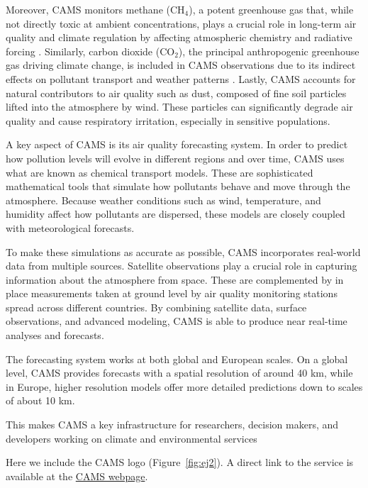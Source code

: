 Moreover, CAMS monitors methane (CH$_4$), a potent greenhouse gas that, while not directly toxic at ambient concentrations, plays a crucial role in long-term air quality and climate regulation by affecting atmospheric chemistry and radiative forcing \cite{lelieveld1993climate}. Similarly, carbon dioxide (CO$_2$), the principal anthropogenic greenhouse gas driving climate change, is included in CAMS observations due to its indirect effects on pollutant transport and weather patterns \cite{ebi2008climate}. Lastly, CAMS accounts for natural contributors to air quality such as dust, composed of fine soil particles lifted into the atmosphere by wind. These particles can significantly degrade air quality and cause respiratory irritation, especially in sensitive populations.

A key aspect of CAMS is its air quality forecasting system. In order to predict how pollution levels will evolve in different regions and over time, CAMS uses what are known as chemical transport models. These are sophisticated mathematical tools that simulate how pollutants behave and move through the atmosphere. Because weather conditions such as wind, temperature, and humidity affect how pollutants are dispersed, these models are closely coupled with meteorological forecasts.

To make these simulations as accurate as possible, CAMS incorporates real-world data from multiple sources. Satellite observations play a crucial role in capturing information about the atmosphere from space. These are complemented by in place measurements taken at ground level by air quality monitoring stations spread across different countries. By combining satellite data, surface observations, and advanced modeling, CAMS is able to produce near real-time analyses and forecasts.

The forecasting system works at both global and European scales. On a global level, CAMS provides forecasts with a spatial resolution of around 40 km, while in Europe, higher resolution models offer more detailed predictions down to scales of about 10 km.

This makes CAMS a key infrastructure for researchers, decision makers, and developers working on
climate and environmental services


Here we include the CAMS logo (Figure~\ref{fig:ej2}). A direct link to the service is available at the \href{https://atmosphere.copernicus.eu/}{CAMS webpage}.

